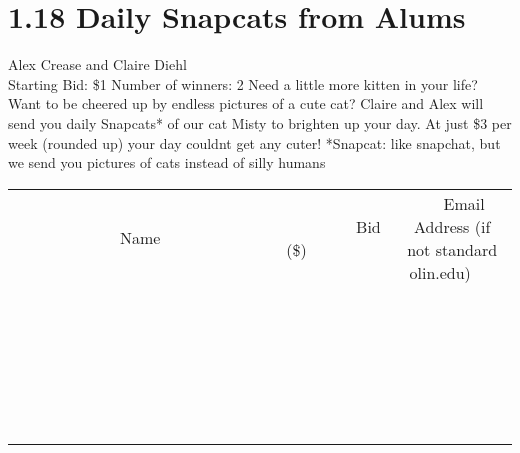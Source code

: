 \documentclass[11pt]{article}
\begin{document}
\section*{1.18 Daily Snapcats from Alums}
Alex Crease and Claire Diehl
\\
Starting Bid: \$1
\newline
Number of winners: 2
\newline
Need a little more kitten in your life? Want to be cheered up by endless pictures of a cute cat? Claire and Alex will send you daily Snapcats* of our cat Misty to brighten up your day. At just \$3 per week (rounded up) your day couldnt get any cuter!
*Snapcat: like snapchat, but we send you pictures of cats instead of silly humans
\\[6ex]
\begin{tabular}{c c c}
~~~~~~~~~~~~~Name~~~~~~~~~~~~~ & ~~~~~~~~~Bid (\$)~~~~~~~~~  & ~~~Email Address (if not standard olin.edu)~~~\\
 & & \\
\hline
 & & \\
\hline
 & & \\
\hline
 & & \\
\hline
 & & \\
\hline
 & & \\
\hline
 & & \\
\hline
 & & \\
\hline
 & & \\
\hline
 & & \\
\hline
 & & \\
\hline
 & & \\
\hline
 & & \\
\hline
 & & \\
\hline
 & & \\
\hline
 & & \\
\hline
 & & \\
\hline
 & & \\
\hline
 & & \\
\hline
 & & \\
\hline
 & & \\
\hline
 & & \\
\hline
 & & \\
\hline
 & & \\
\hline
 & & \\
\hline
 & & \\
\hline
\end{tabular}
\newpage
\end{document}
